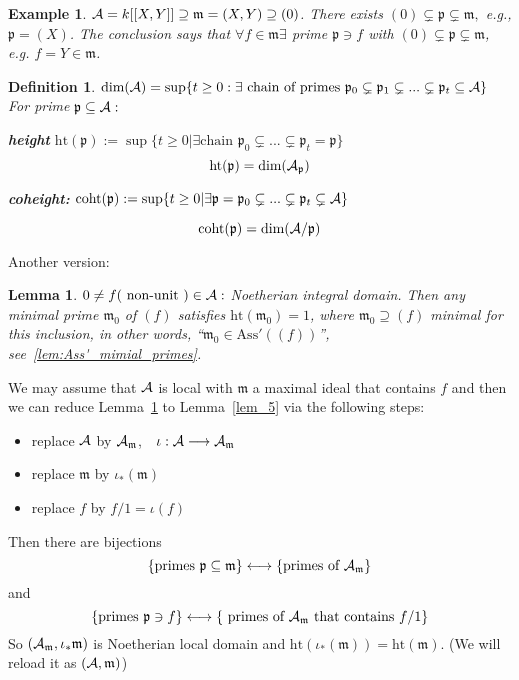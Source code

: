 \documentclass[11pt]{article}
\newtheorem{lemma}[thm]{Lemma}
\newtheorem{dfn}[thm]{Definition}
\newtheorem{ex}[thm]{Example}
\newcommand{\scm}{{\mathfrak m}}
\newcommand{\scp}{{\mathfrak p}}
\newcommand{\cala}{{\cal A}}
\newcommand{\lrta}{\longrightarrow}
\newcommand{\llrta}{\longleftrightarrow}
\begin{document}
\begin{ex}
$\cala=k[[X,Y]]\supseteq \scm=(X,Y)\supseteq (0)$. There exists $(0)\subsetneq\scp\subsetneq\scm,$ e.g., $\scp=(X)$. The conclusion says that $\forall f\in\scm\exists $ prime $\scp\ni f$ with  $(0)\subsetneq \scp\subsetneq \scm$, e.g. $f=Y\in\scm$.
\end{ex}




\begin{dfn}
$\text{dim}(\cala)=\sup \{t\geq 0:\exists \text{ chain of primes $\scp_0\subsetneq \scp_1\subsetneq ...\subsetneq \scp_t\subseteq \cala$}\}$\\

For prime $\scp\subseteq \cala:$

 \textbf{ height }$\text{ht}(\scp):=\sup \{t\geq 0|\exists\text{chain $\scp_0\subsetneq ...\subsetneq \scp_t=\scp$}\}$
$$
\text{ht}(\scp)=\text{dim}(\cala_\scp)
$$

\textbf{coheight:} $\text{coht}(\scp):=\sup\{t\geq 0|\exists \scp=\scp_0\subsetneq ...\subsetneq \scp_t\subsetneq \cala\}$

$$
\text{coht}(\scp)=\text{dim}(\cala/\scp)
$$
\end{dfn}
 
Another version:
\begin{lemma}\label{lem_5'}
$0\neq f(\text{ non-unit })\in\cala:$ Noetherian integral domain. Then any minimal prime $\scm_0$ of $(f)$ satisfies $\text{ht}(\scm_0)= 1$, where
$\scm_0\supseteq (f)$ minimal for this inclusion, in other words, ``$\scm_0\in \text{Ass}'((f))$'', see~\ref{lem:Ass'_mimial_primes}.
\end{lemma}

We may assume that $\cala$ is local with $\scm$ a maximal ideal that contains $f$ and then we can reduce Lemma~\ref{lem_5'} to Lemma~\ref{lem_5} via the following steps: 
\begin{itemize}
\item replace $\cala$ by $\cala_{\scm}$,\ \  $\iota:\cala\lrta \cala_{\scm}$
\item replace $\scm$ by $\iota_*(\scm)$
\item replace $f$ by $f/1=\iota(f)$
\end{itemize}

Then there are bijections 
$$
\{\text{primes $\scp\subseteq \scm$}\}\llrta \text{\{primes of $\cala_{\scm}$\}}
$$
and  
$$
\{\text{primes $\scp\ni f$}\} \llrta\{\text{ primes of }\cala_{\scm}\text{ that contains } f/1\}
$$
So $(\cala_\scm,\iota_*\scm)$ is Noetherian local domain and $\text{ht}(\iota_*(\scm))=\text{ht}(\scm)$. (We will reload it as $(\cala,\scm)$)
\end{document}
